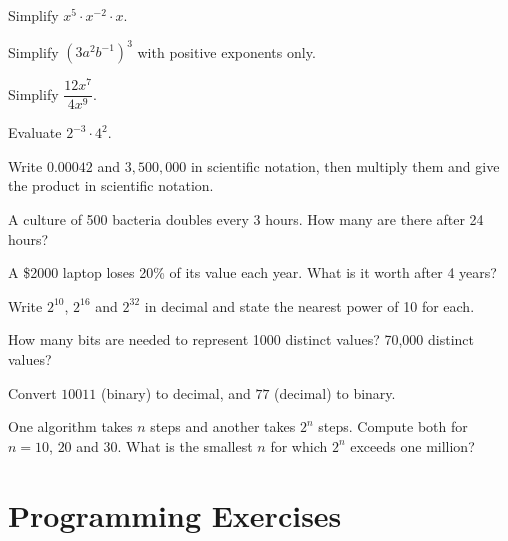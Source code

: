\begin{multicols}{2}
\begin{exercises}
\item Simplify $x^5 \cdot x^{-2} \cdot x$.
\item Simplify $(3a^2 b^{-1})^3$ with positive exponents only.
\item Simplify $\dfrac{12x^7}{4x^9}$.
\item Evaluate $2^{-3} \cdot 4^2$.
\item Write $0.00042$ and $3{,}500{,}000$ in scientific notation, then multiply them and give the product in scientific notation.
\item A culture of 500 bacteria doubles every 3 hours. How many are there after 24 hours?
\item A \$2000 laptop loses 20\% of its value each year. What is it worth after 4 years?
\item Write $2^{10}$, $2^{16}$ and $2^{32}$ in decimal and state the nearest power of 10 for each.
\item How many bits are needed to represent 1000 distinct values? 70{,}000 distinct values?
\item Convert $10011$ (binary) to decimal, and $77$ (decimal) to binary.
\item One algorithm takes $n$ steps and another takes $2^n$ steps. Compute both for $n = 10$, $20$ and $30$. What is the smallest $n$ for which $2^n$ exceeds one million?
\end{exercises}
\end{multicols}

\section{Programming Exercises}

